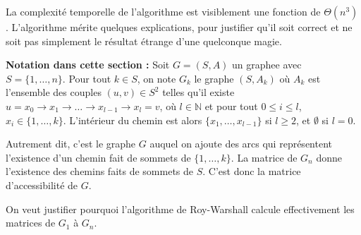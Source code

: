 \documentclass[../../../main.tex]{subfiles}
\begin{document}
La complexité temporelle de l'algorithme est visiblement une fonction de $\Theta(n^3)$. \newline
L'algorithme mérite quelques explications, pour justifier qu'il soit correct et ne soit pas simplement le résultat étrange d'une quelconque magie.

\textbf{Notation dans cette section :} Soit $G = (S, A)$ un graphee avec $S = \{1, \dots, n\}$. Pour tout $k\in S$, on note $G_k$ le graphe $(S, A_k)$ où $A_k$ est l'ensemble des couples $(u, v)\in S^2$ telles qu'il existe $u = x_0\rightarrow x_1 \rightarrow \dots \rightarrow x_{l-1} \rightarrow x_l = v$, où $l\in\mathbb{N}$ et pour tout $0\leq i\leq l$, $x_i\in\{1, \dots, k\}$. L'intérieur du chemin est alors $\{x_1, \dots, x_{l-1}\}$ si $l\geq 2$, et $\emptyset$ si $l = 0$.

Autrement dit, c'est le graphe $G$ auquel on ajoute des arcs qui représentent l'existence d'un chemin fait de sommets de $\{1, \dots, k\}$. La matrice de $G_n$ donne l'existence des chemins faits de sommets de $S$. C'est donc la matrice d'accessibilité de $G$.

On veut justifier pourquoi l'algorithme de Roy-Warshall calcule effectivement les matrices de $G_1$ à $G_n$. 
\end{document}
